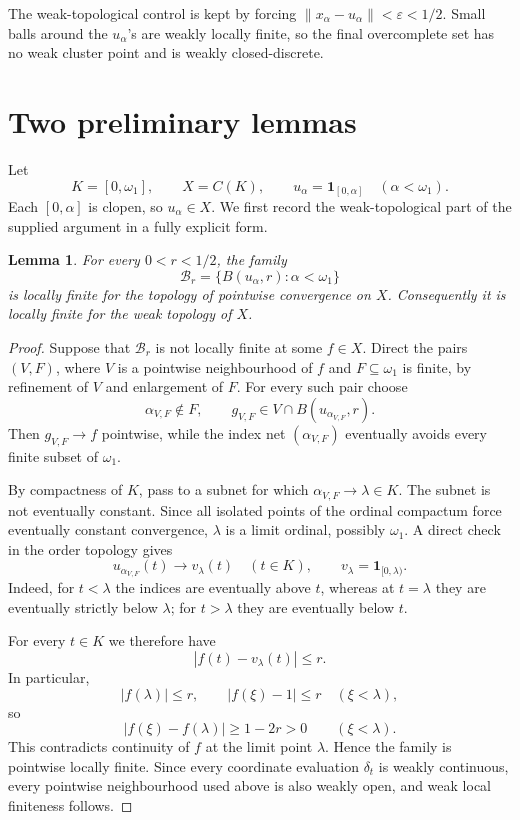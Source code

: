 \documentclass[11pt]{article}
\newtheorem{lemma}[theorem]{Lemma}
\theoremstyle{remark}
\newcommand{\one}{\mathbf 1}
\begin{document}
The weak-topological control is kept by forcing
\(\|x_\alpha-u_\alpha\|<\varepsilon<1/2\).  Small balls around the
\(u_\alpha\)'s are weakly locally finite, so the final overcomplete set has no
weak cluster point and is weakly closed-discrete.

\section{Two preliminary lemmas}

Let
\[
  K=[0,\omega_1],\qquad X=C(K),\qquad
  u_\alpha=\one_{[0,\alpha]}\quad(\alpha<\omega_1).
\]
Each $[0,\alpha]$ is clopen, so $u_\alpha\in X$.  We first record the
weak-topological part of the supplied argument in a fully explicit form.

\begin{lemma}\label{lem:localfinite}
For every $0<r<1/2$, the family
\[
  \mathcal B_r=\{B(u_\alpha,r):\alpha<\omega_1\}
\]
is locally finite for the topology of pointwise convergence on $X$.
Consequently it is locally finite for the weak topology of $X$.
\end{lemma}

\begin{proof}
Suppose that $\mathcal B_r$ is not locally finite at some $f\in X$.  Direct the
pairs $(V,F)$, where $V$ is a pointwise neighbourhood of $f$ and
$F\subseteq\omega_1$ is finite, by refinement of $V$ and enlargement of $F$.
For every such pair choose
\[
  \alpha_{V,F}\notin F,
  \qquad
  g_{V,F}\in V\cap B(u_{\alpha_{V,F}},r).
\]
Then $g_{V,F}\to f$ pointwise, while the index net
$(\alpha_{V,F})$ eventually avoids every finite subset of $\omega_1$.

By compactness of $K$, pass to a subnet for which
$\alpha_{V,F}\to\lambda\in K$.  The subnet is not eventually constant.  Since
all isolated points of the ordinal compactum force eventually constant
convergence, $\lambda$ is a limit ordinal, possibly $\omega_1$.  A direct check
in the order topology gives
\[
  u_{\alpha_{V,F}}(t)\longrightarrow v_\lambda(t)
  \quad(t\in K),
  \qquad
  v_\lambda=\one_{[0,\lambda)}.
\]
Indeed, for $t<\lambda$ the indices are eventually above $t$, whereas at
$t=\lambda$ they are eventually strictly below $\lambda$; for $t>\lambda$ they
are eventually below $t$.

For every $t\in K$ we therefore have
\[
  |f(t)-v_\lambda(t)|\le r.
\]
In particular,
\[
  |f(\lambda)|\le r,
  \qquad
  |f(\xi)-1|\le r\quad(\xi<\lambda),
\]
so
\[
  |f(\xi)-f(\lambda)|\ge 1-2r>0
  \qquad(\xi<\lambda).
\]
This contradicts continuity of $f$ at the limit point $\lambda$.  Hence the
family is pointwise locally finite.  Since every coordinate evaluation
$\delta_t$ is weakly continuous, every pointwise neighbourhood used above is
also weakly open, and weak local finiteness follows.
\end{proof}
\end{document}
